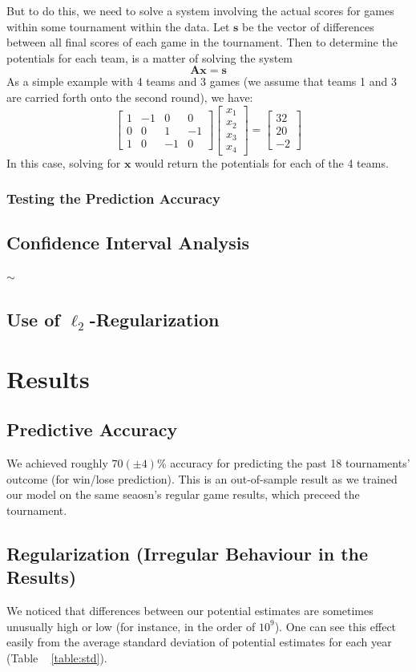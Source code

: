 \documentclass{article} %
\begin{document}
But to do this, we need to solve a system involving the actual scores for games within some tournament within the data. Let $\mathbf{s}$ be the vector of differences between all final scores of each game in the tournament. Then to determine the potentials for each team, is a matter of solving the system 
\[\mathbf{A}\mathbf{x} = \mathbf{s} \]
As a simple example with 4 teams and 3 games (we assume that teams 1 and 3 are carried forth onto the second round), we have:
\[
\begin{bmatrix}
  1&-1&0&0\\
  0&0&1&-1\\
  1&0&-1&0
\end{bmatrix}\begin{bmatrix}
  x_1\\x_2\\x_3\\x_4
\end{bmatrix} = \begin{bmatrix}
  32\\20\\-2
\end{bmatrix}
\]
In this case, solving for $\mathbf{x}$ would return the potentials for each of the 4 teams.
\subsubsection{Testing the Prediction Accuracy}
\subsection{Confidence Interval Analysis}
$\sim$
\subsection{Use of $\ell_2$-Regularization}\label{sec:l2}

\section{Results}
\subsection{Predictive Accuracy}
We achieved roughly $70(\pm4)\%$ accuracy for predicting the past 18 tournaments' outcome (for win/lose prediction).  This is an out-of-sample result as we trained our model on the same seaosn's regular game results, which preceed the tournament.
\subsection{Regularization (Irregular Behaviour in the Results)}
We noticed that differences between our potential estimates are sometimes unusually high or low (for instance, in the order of $10^9$).  One can see this effect easily from the average standard deviation of potential estimates for each year (Table ~ \ref{table:std}).
\end{document}
